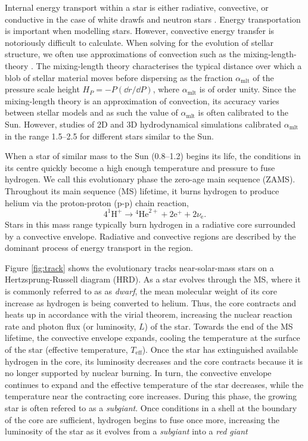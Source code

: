 Internal energy transport within a star is either radiative, convective, or conductive in the case of white drawfs and neutron stars \citep{Yakovlev.Urpin1980}. Energy transportation is important when modelling stars. However, convective energy transfer is notoriously difficult to calculate. When solving for the evolution of stellar structure, we often use approximations of convection such as the mixing-length-theory \citep{Bohm-Vitense1958, Gough1977}. The mixing-length theory characterises the typical distance over which a blob of stellar material moves before dispersing as the fraction $\alpha_\mathrm{mlt}$ of the pressure scale height $H_P = -P (\dd r / \dd P)$, where $\alpha_\mathrm{mlt}$ is of order unity. Since the mixing-length theory is an approximation of convection, its accuracy varies between stellar models and as such the value of $\alpha_\mathrm{mlt}$ is often calibrated to the Sun. However, studies of 2D \citep{Ludwig.Freytag.ea1999} and 3D \citep{Trampedach.Stein.ea2014} hydrodynamical simulations calibrated $\alpha_\mathrm{mlt}$ in the range \numrange{1.5}{2.5} for different stars similar to the Sun.

When a star of similar mass to the Sun (\SIrange{0.8}{1.2}{\solarmass}) begins its life, the conditions in its centre quickly become a high enough temperature and pressure to fuse hydrogen. We call this evolutionary phase the zero-age main sequence (ZAMS). Throughout its main sequence (MS) lifetime, it burns hydrogen to produce helium via the proton-proton (p-p) chain reaction,
\begin{equation}
    4^{1} \mathrm{H}^{+} \rightarrow  {}^{4}\mathrm{He}^{2+}+2 \mathrm{e}^{+}+2 \nu_\mathrm{e}.
\end{equation}
Stars in this mass range typically burn hydrogen in a radiative core surrounded by a convective envelope. Radiative and convective regions are described by the dominant process of energy transport in the region.

Figure \ref{fig:track} shows the evolutionary tracks near-solar-mass stars on a Hertzsprung-Russell diagram (HRD). As a star evolves through the MS, where it is commonly referred to as as \emph{dwarf}, the mean molecular weight of its core increase as hydrogen is being converted to helium. Thus, the core contracts and heats up in accordance with the virial theorem, increasing the nuclear reaction rate and photon flux (or luminosity, $L$) of the star. Towards the end of the MS lifetime, the convective envelope expands, cooling the temperature at the surface of the star (effective temperature, $T_\mathrm{eff}$). Once the star has extinguished available hydrogen in the core, its luminosity decreases and the core contracts because it is no longer supported by nuclear burning. In turn, the convective envelope continues to expand and the effective temperature of the star decreases, while the temperature near the contracting core increases. During this phase, the growing star is often refered to as a \emph{subgiant}. Once conditions in a shell at the boundary of the core are sufficient, hydrogen begins to fuse once more, increasing the luminosity of the star as it evolves from a \emph{subgiant} into a \emph{red giant}

